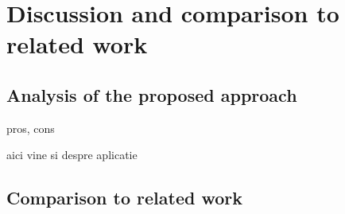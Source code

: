 \section{Discussion and comparison to related work}
\subsection{Analysis of the proposed approach}
pros, cons


aici vine si despre aplicatie
\subsection{Comparison to related work}

